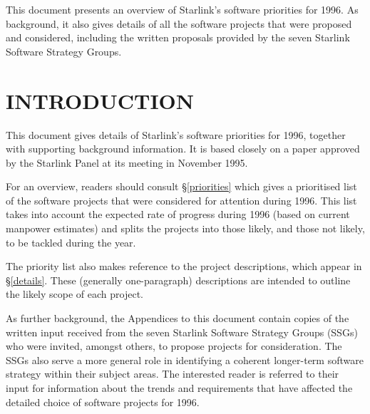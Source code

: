 This document presents an overview of Starlink's software priorities
for 1996. As background, it also gives details of all the software
projects that were proposed and considered, including the written
proposals provided by the seven Starlink Software Strategy Groups.
 \newpage
 \begin{latexonly}
   \vspace{30mm}
   \setlength{\parskip}{0mm}
   \latexonlytoc
   \setlength{\parskip}{\medskipamount}
   \markright{\stardocname}
 \end{latexonly}
\newpage
\renewcommand{\thepage}{\arabic{page}}
\setcounter{page}{1}
\section{INTRODUCTION}

This document gives details of Starlink's software priorities for
1996, together with supporting background information. It is based
closely on a paper approved by the Starlink Panel at its meeting in
November 1995.

For an overview, readers should consult \S\ref{priorities} which gives
a prioritised list of the software projects that were considered for
attention during 1996. This list takes into account the expected rate
of progress during 1996 (based on current manpower estimates) and
splits the projects into those likely, and those not likely, to be
tackled during the year.

The priority list also makes reference to the project descriptions,
which appear in \S\ref{details}. These (generally one-paragraph)
descriptions are intended to outline the likely scope of each project.

As further background, the Appendices to this document contain copies
of the written input received from the seven Starlink Software
Strategy Groups (SSGs) who were invited, amongst others, to propose
projects for consideration. The SSGs also serve a more general role in
identifying a coherent longer-term software strategy within their
subject areas. The interested reader is referred to their input for
information about the trends and requirements that have affected the
detailed choice of software projects for 1996.

